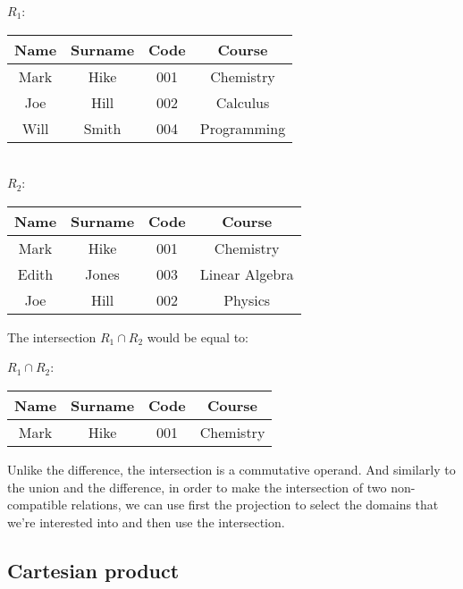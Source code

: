 \begin{center}
    $R_1$: \quad \begin{tabular}{|c|c|c|c|}
        \hline \rowcolor{maindoccol!60}
        \textbf{Name} & \textbf{Surname} & \textbf{Code} & \textbf{Course} \\
        \hline
        Mark & Hike & 001 & Chemistry \\
        \hline
        Joe & Hill & 002 & Calculus \\
        \hline
        Will & Smith & 004 & Programming \\
        \hline
    \end{tabular} \\
    \vspace{12pt} $R_2$: \quad \begin{tabular}{|c|c|c|c|}
        \hline \rowcolor{maindoccol!60}
        \textbf{Name} & \textbf{Surname} & \textbf{Code} & \textbf{Course} \\
        \hline
        Mark & Hike & 001 & Chemistry \\
        \hline
        Edith & Jones & 003 & Linear Algebra \\
        \hline
        Joe & Hill & 002 & Physics \\
        \hline
    \end{tabular}
\end{center}

The intersection $R_1 \cap R_2$ would be equal to:

\begin{center}
    $R_1 \cap R_2$: \quad \begin{tabular}{|c|c|c|c|}
        \hline \rowcolor{maindoccol!60}
        \textbf{Name} & \textbf{Surname} & \textbf{Code} & \textbf{Course} \\
        \hline
        Mark & Hike & 001 & Chemistry \\
        \hline
    \end{tabular}
\end{center}

Unlike the difference, the intersection is a commutative operand. And similarly to the union and the difference, in order to make the intersection of two non-compatible relations, we can use first the projection to select the domains that we're interested into and then use the intersection.

\subsection{Cartesian product}

